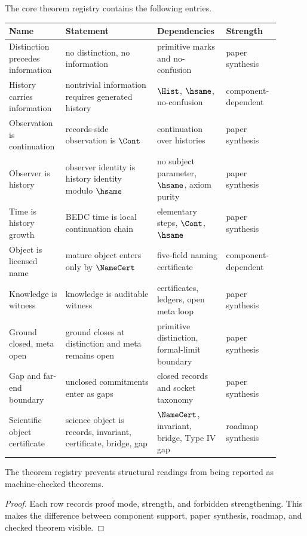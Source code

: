 \begin{definition}
\label{def:philosophy-core-theorem-registry}
The core theorem registry contains the following entries.

\begin{center}
\begin{tabular}{p{0.18\linewidth}p{0.32\linewidth}p{0.22\linewidth}p{0.18\linewidth}}
\textbf{Name} & \textbf{Statement} & \textbf{Dependencies} & \textbf{Strength} \\
\hline
Distinction precedes information & no distinction, no information & primitive marks and no-confusion & paper synthesis \\
History carries information & nontrivial information requires generated history & \(\Hist\), \(\hsame\), no-confusion & component-dependent \\
Observation is continuation & records-side observation is \(\Cont\) & continuation over histories & paper synthesis \\
Observer is history & observer identity is history identity modulo \(\hsame\) & no subject parameter, \(\hsame\), axiom purity & paper synthesis \\
Time is history growth & BEDC time is local continuation chain & elementary steps, \(\Cont\), \(\hsame\) & paper synthesis \\
Object is licensed name & mature object enters only by \(\NameCert\) & five-field naming certificate & component-dependent \\
Knowledge is witness & knowledge is auditable witness & certificates, ledgers, open meta loop & paper synthesis \\
Ground closed, meta open & ground closes at distinction and meta remains open & primitive distinction, formal-limit boundary & paper synthesis \\
Gap and far-end boundary & unclosed commitments enter as gaps & closed records and socket taxonomy & paper synthesis \\
Scientific object certificate & science object is records, invariant, certificate, bridge, gap & \(\NameCert\), invariant, bridge, Type IV gap & roadmap synthesis \\
\end{tabular}
\end{center}
\end{definition}

\begin{theorem}
\label{thm:philosophy-theorem-registry-controls-strength}
The theorem registry prevents structural readings from being reported
as machine-checked theorems.
\end{theorem}
\begin{proof}
Each row records proof mode, strength, and forbidden strengthening.
This makes the difference between component support, paper synthesis,
roadmap, and checked theorem visible.
\end{proof}

